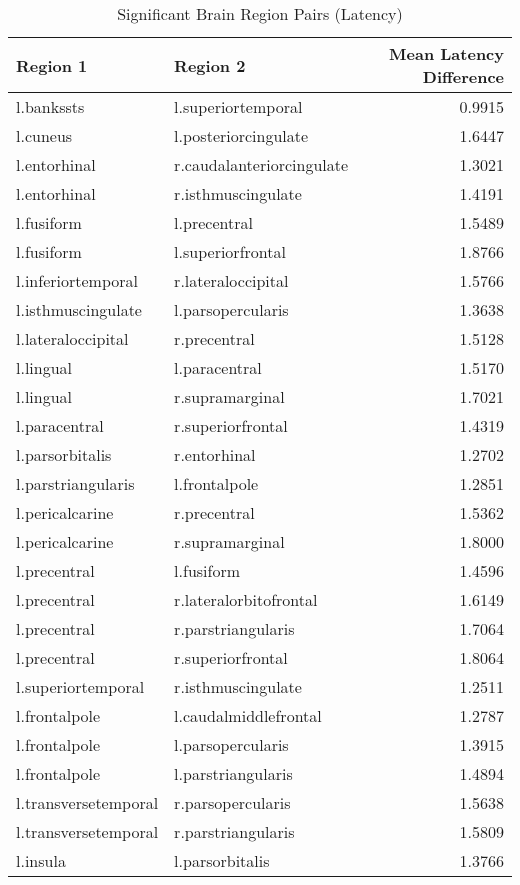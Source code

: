\begin{table}
\caption{Significant Brain Region Pairs (Latency)}
\label{tab:significant_latency}
\begin{tabular}{llr}
\toprule
Region 1 & Region 2 & Mean Latency Difference \\
\midrule
l.bankssts & l.superiortemporal & 0.9915 \\
l.cuneus & l.posteriorcingulate & 1.6447 \\
l.entorhinal & r.caudalanteriorcingulate & 1.3021 \\
l.entorhinal & r.isthmuscingulate & 1.4191 \\
l.fusiform & l.precentral & 1.5489 \\
l.fusiform & l.superiorfrontal & 1.8766 \\
l.inferiortemporal & r.lateraloccipital & 1.5766 \\
l.isthmuscingulate & l.parsopercularis & 1.3638 \\
l.lateraloccipital & r.precentral & 1.5128 \\
l.lingual & l.paracentral & 1.5170 \\
l.lingual & r.supramarginal & 1.7021 \\
l.paracentral & r.superiorfrontal & 1.4319 \\
l.parsorbitalis & r.entorhinal & 1.2702 \\
l.parstriangularis & l.frontalpole & 1.2851 \\
l.pericalcarine & r.precentral & 1.5362 \\
l.pericalcarine & r.supramarginal & 1.8000 \\
l.precentral & l.fusiform & 1.4596 \\
l.precentral & r.lateralorbitofrontal & 1.6149 \\
l.precentral & r.parstriangularis & 1.7064 \\
l.precentral & r.superiorfrontal & 1.8064 \\
l.superiortemporal & r.isthmuscingulate & 1.2511 \\
l.frontalpole & l.caudalmiddlefrontal & 1.2787 \\
l.frontalpole & l.parsopercularis & 1.3915 \\
l.frontalpole & l.parstriangularis & 1.4894 \\
l.transversetemporal & r.parsopercularis & 1.5638 \\
l.transversetemporal & r.parstriangularis & 1.5809 \\
l.insula & l.parsorbitalis & 1.3766 \\

\end{tabular}
\end{table}
